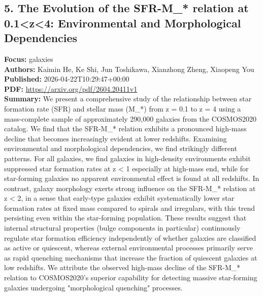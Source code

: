 \documentclass[11pt]{article}
\begin{document}
\subsection*{5. The Evolution of the SFR-M\_* relation at 0.1<z<4: Environmental and Morphological Dependencies}
\textbf{Focus:} galaxies\\
\textbf{Authors:} Kaimin He, Ke Shi, Jun Toshikawa, Xianzhong Zheng, Xiaopeng You\\
\textbf{Published:} 2026-04-22T10:29:47+00:00\\
\textbf{PDF:} \href{https://arxiv.org/pdf/2604.20411v1}{https://arxiv.org/pdf/2604.20411v1}\\
\textbf{Summary:}
We present a comprehensive study of the relationship between star formation rate (SFR) and stellar mass (M\_*) from z = 0.1 to z = 4 using a mass-complete sample of approximately 290,000 galaxies from the COSMOS2020 catalog. We find that the SFR-M\_* relation exhibits a pronounced high-mass decline that becomes increasingly evident at lower redshifts. Examining environmental and morphological dependencies, we find strikingly different patterns. For all galaxies, we find galaxies in high-density environments exhibit suppressed star formation rates at z < 1 especially at high-mass end, while for star-forming galaxies no apparent environmental effect is found at all redshifts. In contrast, galaxy morphology exerts strong influence on the SFR-M\_* relation at z < 2, in a sense that early-type galaxies exhibit systematically lower star formation rates at fixed mass compared to spirals and irregulars, with this trend persisting even within the star-forming population. These results suggest that internal structural properties (bulge components in particular) continuously regulate star formation efficiency independently of whether galaxies are classified as active or quiescent, whereas external environmental processes primarily serve as rapid quenching mechanisms that increase the fraction of quiescent galaxies at low redshifts. We attribute the observed high-mass decline of the SFR-M\_* relation to COSMOS2020's superior capability for detecting massive star-forming galaxies undergoing "morphological quenching" processes.
\newpage
\end{document}
